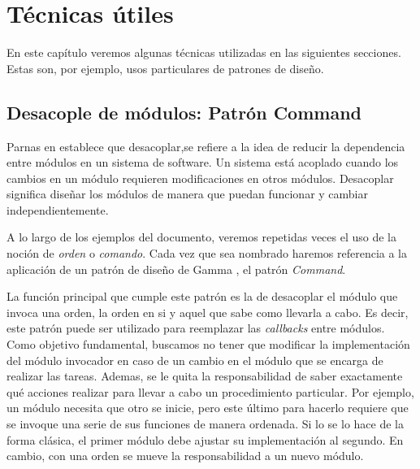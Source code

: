 %
%


\chapter{Técnicas útiles}
En este capítulo veremos algunas técnicas utilizadas en las siguientes secciones. Estas son, por ejemplo, usos particulares de patrones de diseño.


\section{Desacople de módulos:  Patrón Command}

Parnas en \cite{Parnas1972} establece que desacoplar,se refiere a la idea de reducir la dependencia entre módulos en un sistema de software. Un sistema está acoplado cuando los cambios en un módulo requieren modificaciones en otros módulos. Desacoplar significa diseñar los módulos de manera que puedan funcionar y cambiar independientemente.

A lo largo de los ejemplos del documento, veremos repetidas veces el uso de la noción de \textit{orden} o \textit{comando}. Cada vez que sea nombrado haremos referencia a la aplicación de un patrón de diseño de Gamma \cite{Gamma:1995:DPE:186897}, el patrón \textit{Command}. 

La función principal que cumple este patrón es la de desacoplar el módulo que invoca una orden, la orden en si y aquel que sabe como llevarla a cabo. Es decir, este patrón puede ser utilizado para reemplazar las \textit{callbacks} entre módulos. Como objetivo fundamental, buscamos no tener que modificar la implementación del módulo invocador en caso de un cambio en el módulo que se encarga de realizar las tareas. Ademas, se le quita la responsabilidad de saber exactamente qué acciones realizar para llevar a cabo un procedimiento particular. Por ejemplo, un módulo necesita que otro se inicie, pero este último para hacerlo requiere que se invoque una serie de sus funciones de manera ordenada. Si lo se lo hace de la forma clásica, el primer módulo debe ajustar su implementación al segundo. En cambio, con una orden se mueve la responsabilidad a un nuevo módulo.

